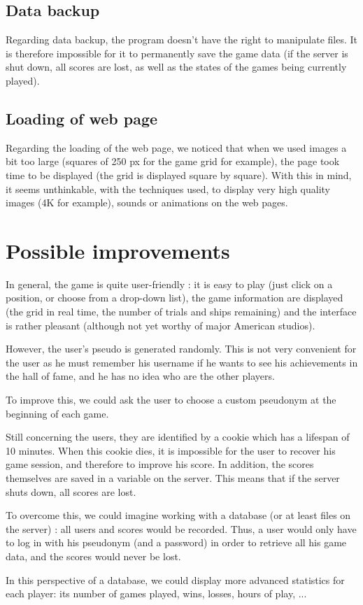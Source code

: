 \documentclass[a4paper, 12pt]{article}
\begin{document}
	\subsection{Data backup}
	Regarding data backup, the program doesn't have the right to manipulate files. It is therefore impossible for it to permanently save the game data (if the server is shut down, all scores are lost, as well as the states of the games being currently played).
	\subsection{Loading of web page}
	Regarding the loading of the web page, we noticed that when we used images a bit too large (squares of 250 px for the game grid for example), the page took time to be displayed (the grid is displayed square by square). With this in mind, it seems unthinkable, with the techniques used, to display very high quality images (4K for example), sounds or animations on the web pages.
	\section{Possible improvements}
	In general, the game is quite user-friendly : it is easy to play (just click on a position, or choose from a drop-down list), the game information are displayed (the grid in real time, the number of trials and ships remaining) and the interface is rather pleasant (although not yet worthy of major American studios).\par
	However, the user's pseudo is generated randomly. This is not very convenient for the user as he must remember his username if he wants to see his achievements in the hall of fame, and he has no idea who are the other players.\par
	To improve this, we could ask the user to choose a custom pseudonym at the beginning of each game.\par
	Still concerning the users, they are identified by a cookie which has a lifespan of 10 minutes. When this cookie dies, it is impossible for the user to recover his game session, and therefore to improve his score. In addition, the scores themselves are saved in a variable on the server. This means that if the server shuts down, all scores are lost.\par
	To overcome this, we could imagine working with a database (or at least files on the server) : all users and scores would be recorded. Thus, a user would only have to log in with his pseudonym (and a password) in order to retrieve all his game data, and the scores would never be lost.\par
	In this perspective of a database, we could display more advanced statistics for each player: its number of games played, wins, losses, hours of play, ...
\end{document}
